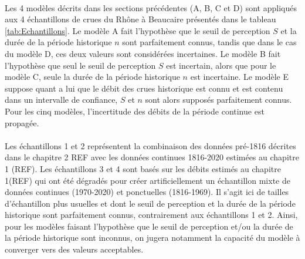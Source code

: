 \documentclass[11pt]{article}
\begin{document}
	\paragraph{} Les 4 modèles décrits dans les sections précédentes (A, B, C et D) sont appliqués aux 4 échantillons de crues du Rhône à Beaucaire présentés dans le tableau \ref{tab:Echantillons}. Le modèle A fait l'hypothèse que le seuil de perception $S$ et la durée de la période historique $n$ sont parfaitement connus, tandis que dans le cas du modèle D, ces deux valeurs sont considérées incertaines. Le modèle B fait l'hypothèse que seul le seuil de perception $S$ est incertain, alors que pour le modèle C, seule la durée de la période historique $n$ est incertaine. Le modèle E suppose quant a lui que le débit des crues historique est connu et est contenu dans un intervalle de confiance, $S$ et $n$ sont alors supposés parfaitement connus. Pour les cinq modèles, l'incertitude des débits de la période continue est propagée. 
	
	\paragraph{} Les échantillons 1 et 2 représentent la combinaison des données pré-1816 décrites dans le chapitre 2 REF avec les données continues 1816-2020 estimées au chapitre 1 (REF). Les échantillons 3 et 4 sont basés sur les débits estimés au chapitre 1(REF) qui ont été dégradés pour créer artificiellement un échantillon mixte de données continues (1970-2020) et ponctuelles (1816-1969). Il s'agit ici de tailles d'échantillon plus usuelles et dont le seuil de perception et la durée de la période historique sont parfaitement connus, contrairement aux échantillons 1 et 2. Ainsi, pour les modèles faisant l'hypothèse que le seuil de perception et/ou la durée de la période historique sont inconnus, on jugera notamment la capacité du modèle à converger vers des valeurs acceptables. 
	
\end{document}
